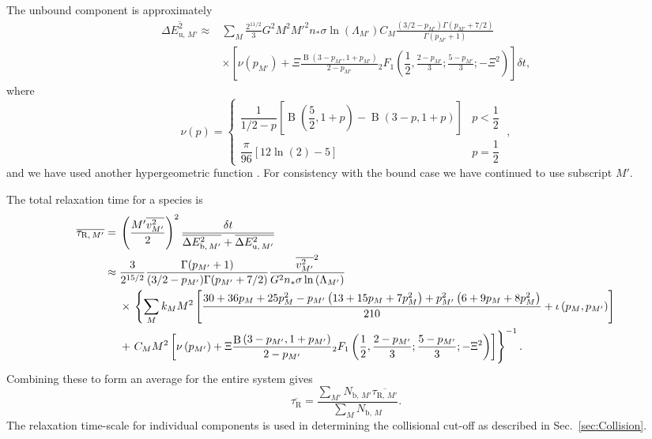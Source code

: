 \documentclass[useAMS,usedcolumn,usegraphicx,usenatbib]{mn2e}
\newcommand{\secref}[1]{Sec.~\ref{sec:#1}}
\DeclareMathOperator{\Beta}{B}
\newcommand{\recip}[1]{\ensuremath{\dfrac{1}{#1}}}
\begin{document}
\begin{onecolumn}
The unbound component is approximately
\begin{align}
\overline{\Delta E^2_{\mathrm{u},\,M'}} \approx {} & \sum_M\frac{2^{11/2}}{3}G^2M^2{M'}^2n_\ast\sigma\ln\left(\Lambda_{M'}\right) C_M \frac{(3/2 - p_{M'})\Gamma(p_{M'} + 7/2)}{\Gamma(p_{M'} + 1)} \nonumber \\
  & \times \left[\nu\left(p_{M'}\right) + \Xi\frac{\Beta\left(3-p_{M'},1+p_{M'}\right)}{2-p_{M'}}{_2F_1}\left(\recip{2},\frac{2-p_{M'}}{3};\frac{5-p_{M'}}{3};-\Xi^2\right) \right] \delta t,
\end{align}
where
\begin{equation}
\nu(p) = \begin{cases} \recip{1/2 - p}\left[\Beta\left(\dfrac{5}{2},1+p\right) - \Beta\left(3-p,1+p\right)\right] & p < \recip{2} \\
\dfrac{\pi}{96}\left[12 \ln(2) - 5\right] & p = \recip{2}
\end{cases} \; ,
\end{equation}
and we have used another hypergeometric function \citep[15.6.1]{Olver2010}. For consistency with the bound case we have continued to use subscript $M'$. 

The total relaxation time for a species is
\begin{align}
\overline{\tau_{\mathrm{R,}\,M'}} = {} & \left(\frac{{M'}\overline{v_{M'}^2}}{2}\right)^2\frac{\delta t}{\overline{\Delta E^2_{\mathrm{b},\,M'}} + \overline{\Delta E^2_{\mathrm{u},\,M'}}} \\
 \approx {} & \frac{3}{2^{15/2}}\frac{\Gamma(p_{M'} + 1)}{(3/2 - p_{M'})\Gamma(p_{M'} + 7/2)}\frac{\overline{v_{M'}^2}^2}{G^2n_\ast\sigma\ln\left(\Lambda_{M'}\right)} \nonumber \\* 
  & \times {} \left\{\sum_M k_M M^2 \left[ \frac{30 + 36p_M + 25p_M^2 - p_{M'}\left(13 + 15p_M + 7 p_M^2\right) + p_{M'}^2\left(6 + 9p_M + 8p_M^2\right)}{210} + \iota \left(p_M,p_{M'}\right)\right] \right. \nonumber \\*
  & + \left. \vphantom{ \left[ \frac{p_{M'}^2\left(6 + 9p_M + 8p_M^2\right)}{210}\right]} C_M M^2 \left[\nu\left(p_{M'}\right) + \Xi\frac{\Beta\left(3-p_{M'},1+p_{M'}\right)}{2-p_{M'}}{_2F_1}\left(\recip{2},\frac{2-p_{M'}}{3};\frac{5-p_{M'}}{3};-\Xi^2\right)\right]\right\}^{-1}.
\end{align}
Combining these to form an average for the entire system gives
\begin{equation}
\overline{\tau_{\mathrm{R}}} = \frac{\sum_{M'}N_{\mathrm{b,}\,M'}\overline{\tau_{\mathrm{R,}\,M'}}}{\sum_{M}N_{\mathrm{b,}\,M}}.
\label{eq:system-relax}
\end{equation}
The relaxation time-scale for individual components is used in determining the collisional cut-off as described in \secref{Collision}.


\end{onecolumn}
\end{document}
